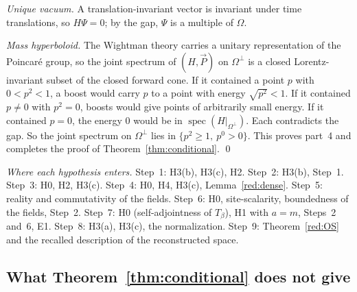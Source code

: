 \emph{Unique vacuum.} A translation-invariant vector is invariant under time translations, so $H\Psi=0$; by the gap, $\Psi$ is a multiple of $\Omega$.

\emph{Mass hyperboloid.} The Wightman theory carries a unitary representation of the Poincar\'e group, so the joint spectrum of $(H,\vec P)$ on $\Omega^\perp$ is a closed Lorentz-invariant subset of the closed forward cone. If it contained a point $p$ with $0<p^2<1$, a boost would carry $p$ to a point with energy $\sqrt{p^2}<1$. If it contained $p\ne0$ with $p^2=0$, boosts would give points of arbitrarily small energy. If it contained $p=0$, the energy $0$ would be in $\operatorname{spec}(H|_{\Omega^\perp})$. Each contradicts the gap. So the joint spectrum on $\Omega^\perp$ lies in $\{p^2\ge1,\ p^0>0\}$. This proves part~4 and completes the proof of Theorem~\ref{thm:conditional}. \qed

\emph{Where each hypothesis enters.} Step~1: H3(b), H3(c), H2. Step~2: H3(b), Step~1. Step~3: H0, H2, H3(c). Step~4: H0, H4, H3(c), Lemma~\ref{red:dense}. Step~5: reality and commutativity of the fields. Step~6: H0, site-scalarity, boundedness of the fields, Step~2. Step~7: H0 (self-adjointness of $T_\beta$), H1 with $a=m$, Steps~2 and~6, E1. Step~8: H3(a), H3(c), the normalization. Step~9: Theorem~\ref{red:OS} and the recalled description of the reconstructed space.

\subsection{What Theorem~\ref{thm:conditional} does not give}\label{red:not}

